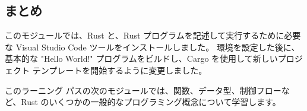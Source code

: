 \subsection{まとめ}

このモジュールでは、Rust と、Rust プログラムを記述して実行するために必要な Visual Studio Code ツールをインストールしました。 環境を設定した後に、基本的な "Hello World!" プログラムをビルドし、Cargo を使用して新しいプロジェクト テンプレートを開始するように変更しました。

このラーニング パスの次のモジュールでは、関数、データ型、制御フローなど、Rust のいくつかの一般的なプログラミング概念について学習します。